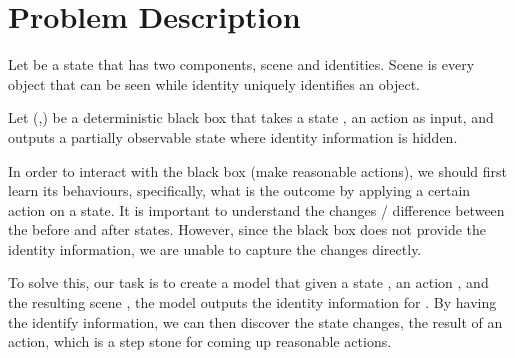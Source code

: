 \documentclass[letterpaper]{article}
\begin{document}
\section{Problem Description}

Let  be a state that has two components, scene and identities. Scene is every object that can be seen while identity uniquely identifies an object.    


Let (,) be a deterministic black box that takes a state , an action  as input, and outputs a partially observable state  where identity information is hidden. 

In order to interact with the black box (make reasonable actions), we should first learn its behaviours, specifically, what is the outcome by applying a certain action on a state. It is important to understand the changes / difference between the before and after states. However, since the black box does not provide the identity information, we are unable to capture the changes directly.    

To solve this, our task is to create a model  that given a state  , an action , and the resulting scene , the model outputs the identity information for . By having the identify information, we can then discover the state changes, the result of an action, which is a step stone for coming up reasonable actions. 
\end{document}
